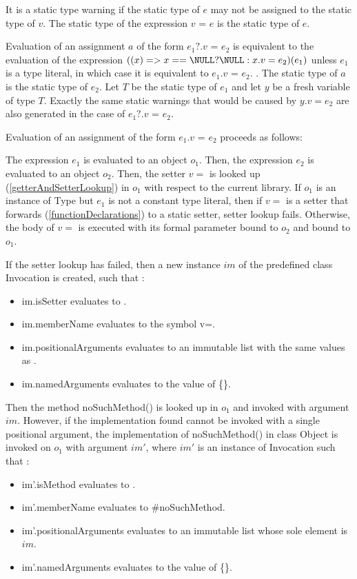 \documentclass{article}
\newcommand{\code}[1]{{\sf #1}}
\begin{document}
\begin{itemize}
\LMHash{}
It is a static type warning if the static type of $e$ may not be assigned to the static type of $v$. The static type of the expression $v$ \code{=} $e$ is the static type of $e$.

\LMHash{}
Evaluation of an assignment $a$ of the form $e_1?.v$ \code{=} $e_2$ is equivalent to the evaluation of the expression $((x) => x == \NULL? \NULL: x.v = e_2)(e_1)$
 unless $e_1$ is  a type literal, in which case it is equivalent to $e_1.v$ \code{=} $e_2$.
. The static type of $a$ is the static type of $e_2$. Let $T$ be the static type of $e_1$ and let $y$ be a fresh variable of type $T$. Exactly the same static warnings that would be caused by $y.v = e_2$ are also generated in the case of $e_1?.v$ \code{=} $e_2$.

\LMHash{}
Evaluation of an assignment of the form $e_1.v$ \code{=} $e_2$ proceeds as follows:

\LMHash{}
The expression $e_1$ is evaluated to an object $o_1$. Then, the expression $e_2$  is evaluated to an object $o_2$. Then, the setter $v=$ is looked up (\ref{getterAndSetterLookup}) in $o_1$ with respect to the current library.  If $o_1$ is an instance of \code{Type} but $e_1$ is not a constant type literal, then if $v=$ is a setter that forwards (\ref{functionDeclarations}) to a static setter, setter lookup fails. Otherwise, the body  of $v=$ is executed with its formal parameter bound to $o_2$ and \THIS{} bound to $o_1$.

\LMHash{}
If the setter lookup has failed, then a new instance $im$  of the predefined class  \code{Invocation}  is created, such that :
\begin{itemize}
\item  \code{im.isSetter} evaluates to \code{\TRUE{}}.
\item  \code{im.memberName} evaluates to the symbol \code{v=}.
\item \code{im.positionalArguments} evaluates to an immutable list with the same values as \code{[$o_2$]}.
\item \code{im.namedArguments} evaluates to the value of \code{\CONST{} \{\}}.
\end{itemize}

\LMHash{}
Then the method \code{noSuchMethod()} is looked up in $o_1$ and invoked  with argument $im$.
However, if the implementation found cannot be invoked with a single positional argument, the implementation  of \code{noSuchMethod()} in class \code{Object} is invoked on $o_1$ with argument $im'$, where $im'$ is an instance of \code{Invocation} such that :
\begin{itemize}
\item  \code{im'.isMethod} evaluates to \code{\TRUE{}}.
\item  \code{im'.memberName} evaluates to \code{\#noSuchMethod}.
\item \code{im'.positionalArguments} evaluates to an immutable list whose sole element is  $im$.
\item \code{im'.namedArguments} evaluates to the value of \code{\CONST{} \{\}}.
\end{itemize}


\end{itemize}
\end{document}
